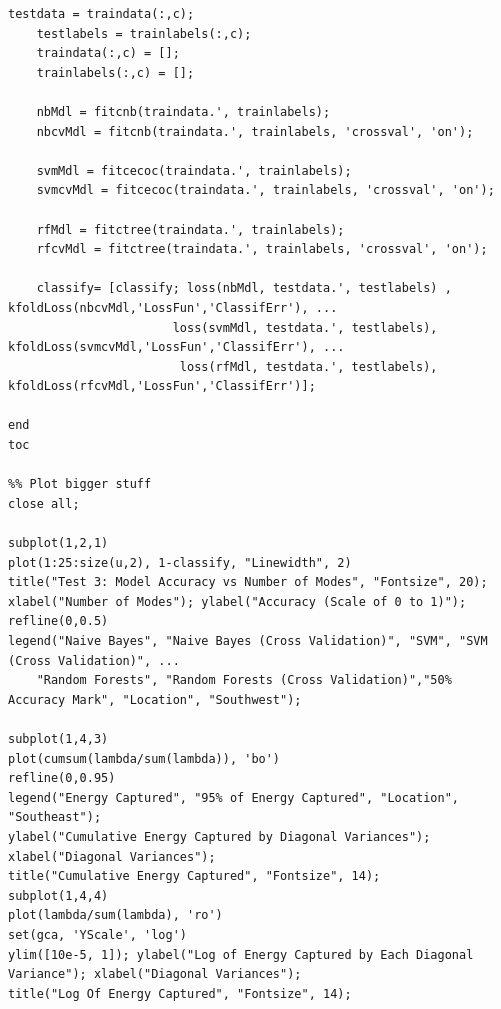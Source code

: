 \documentclass{article}
\begin{document}
\begin{lstlisting}[style=Matlab-editor]
    testdata = traindata(:,c);
    testlabels = trainlabels(:,c);
    traindata(:,c) = [];
    trainlabels(:,c) = [];
    
    nbMdl = fitcnb(traindata.', trainlabels);
    nbcvMdl = fitcnb(traindata.', trainlabels, 'crossval', 'on');

    svmMdl = fitcecoc(traindata.', trainlabels);
    svmcvMdl = fitcecoc(traindata.', trainlabels, 'crossval', 'on');

    rfMdl = fitctree(traindata.', trainlabels);
    rfcvMdl = fitctree(traindata.', trainlabels, 'crossval', 'on');
    
    classify= [classify; loss(nbMdl, testdata.', testlabels) , kfoldLoss(nbcvMdl,'LossFun','ClassifErr'), ...
                       loss(svmMdl, testdata.', testlabels), kfoldLoss(svmcvMdl,'LossFun','ClassifErr'), ...
                        loss(rfMdl, testdata.', testlabels), kfoldLoss(rfcvMdl,'LossFun','ClassifErr')];
                    
end
toc

%% Plot bigger stuff
close all;

subplot(1,2,1)
plot(1:25:size(u,2), 1-classify, "Linewidth", 2)
title("Test 3: Model Accuracy vs Number of Modes", "Fontsize", 20);
xlabel("Number of Modes"); ylabel("Accuracy (Scale of 0 to 1)");
refline(0,0.5)
legend("Naive Bayes", "Naive Bayes (Cross Validation)", "SVM", "SVM (Cross Validation)", ...
    "Random Forests", "Random Forests (Cross Validation)","50% Accuracy Mark", "Location", "Southwest");

subplot(1,4,3)
plot(cumsum(lambda/sum(lambda)), 'bo')
refline(0,0.95)
legend("Energy Captured", "95% of Energy Captured", "Location", "Southeast");
ylabel("Cumulative Energy Captured by Diagonal Variances"); xlabel("Diagonal Variances");
title("Cumulative Energy Captured", "Fontsize", 14);
subplot(1,4,4)
plot(lambda/sum(lambda), 'ro')
set(gca, 'YScale', 'log')
ylim([10e-5, 1]); ylabel("Log of Energy Captured by Each Diagonal Variance"); xlabel("Diagonal Variances");
title("Log Of Energy Captured", "Fontsize", 14);

\end{lstlisting}
\end{document}
